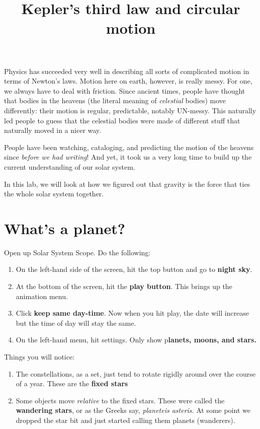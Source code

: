 \documentclass{handout}
\title{Kepler's third law and circular motion}
\begin{document}
\maketitle

Physics has succeeded very well in describing all sorts of complicated motion in terms of Newton's laws. Motion here on earth, however, is really messy. For one, we always have to deal with friction. Since ancient times, people have thought that bodies in the heavens (the literal meaning of \emph{celestial} bodies) move differently: their motion is regular, predictable, notably UN-messy. This naturally led people to guess that the celestial bodies were made of different stuff that naturally moved in a nicer way.

People have been watching, cataloging, and predicting the motion of the heavens since \emph{before we had writing}! And yet, it took us a very long time to build up the current understanding of our solar system.

In this lab, we will look at how we figured out that gravity is the force that ties the whole solar system together.

\section{What's a planet?}
Open up Solar System Scope. Do the following:
\begin{enumerate}
    \item On the left-hand side of the screen, hit the top button and go to \textbf{night sky}.
    \item At the bottom of the screen, hit the \textbf{play button}. This brings up the animation menu.
    \item Click \textbf{keep same day-time}. Now when you hit play, the date will increase but the time of day will stay the same.
    \item On the left-hand menu, hit settings. Only show p\textbf{lanets, moons, and stars.}
\end{enumerate}

Things you will notice:
\begin{enumerate}
    \item The constellations, as a set, just tend to rotate rigidly around over the course of a year. These are the \textbf{fixed stars}
    \item Some objects move \emph{relative} to the fixed stars. These were called the \textbf{wandering stars}, or as the Greeks say, \emph{planeteis asteris}. At some point we dropped the star bit and just started calling them planets (wanderers).
\end{enumerate}
\end{document}
